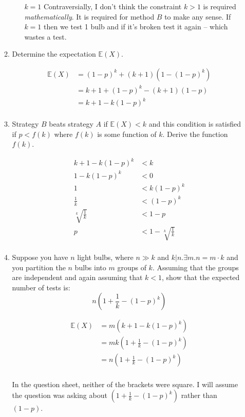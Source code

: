 \documentclass[10pt,\jkfside,a4paper]{article}
\begin{document}
\begin{enumerate}
\begin{enumerate}
\begin{itemize}
\item [$k = 1$]
Contraversially, I don't think the constraint $k > 1$ is required
\textit{mathematically}.
It is required for method $B$ to make any sense.
If $k = 1$ then we test 1 bulb and if it's broken test it again --
which wastes a test.

\end{itemize}

\item
Determine the expectation $\mathbb{E}(X)$.

\[
\begin{split}
\mathbb{E}(X)
&= (1 - p)^k + (k + 1)(1 - (1 - p)^k) \\
&= k + 1 + (1 - p)^k - (k + 1)(1 - p) \\
&= k + 1 - k(1 - p)^k \\
\end{split}
\]

\item
Strategy $B$ beats strategy $A$ if $\mathbb{E}(X) < k$ and this condition
is satisfied if $p < f(k)$ where $f(k)$ is some function of $k$.
Derive the function $f(k)$.

\[
\begin{split}
k + 1 - k(1 - p)^k &< k \\
1 - k(1 - p)^k &< 0 \\
1 &< k(1 - p)^k \\
\frac{1}{k} &< (1 - p)^k \\
\sqrt[k]{\frac{1}{k}} &< 1 - p \\
p &< 1 - \sqrt[k]{\frac{1}{k}} \\
\end{split}
\]

\item
Suppose you have $n$ light bulbs, where $n \gg k$ and $k|n. \exists m. n = m \cdot k$
and you partition the $n$ bulbs into $m$ groups of $k$.
Assuming that the groups are independent and again assuming that $k < 1$, show
that the expected number of tests is:
\[
n\left(1 + \frac{1}{k} - (1 - p)^k\right)
\]

\[
\begin{split}
\mathbb{E}(X) &= m(k + 1 - k(1 - p)^k) \\
              &= mk\left(1 + \frac{1}{k} - (1 - p)^k\right) \\
              &= n\left(1 + \frac{1}{k} - (1 - p)^k\right) \\
\end{split}
\]

In the question sheet, neither of the brackets were square.
I will assume the question was asking
about $(1 + \frac{1}{k} - (1 - p)^k)$ rather than $(1 - p)$.


\end{enumerate}
\end{enumerate}
\end{document}
